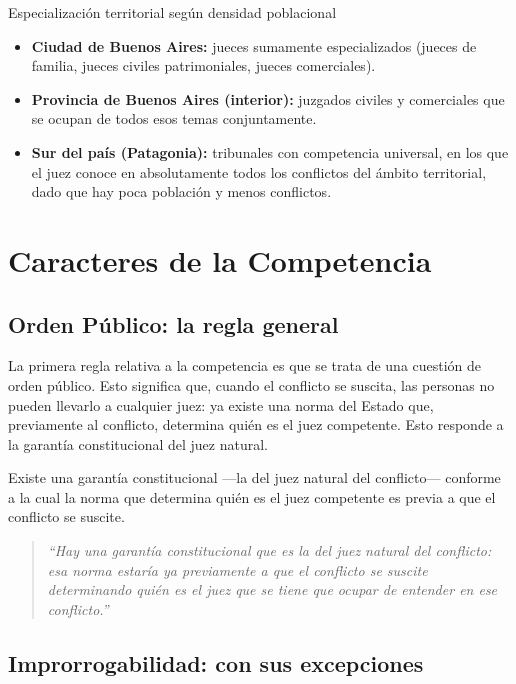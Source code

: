 \documentclass[12pt,oneside]{book}
\begin{document}
\begin{example}{Especialización territorial según densidad poblacional}
\begin{itemize}
\item \textbf{Ciudad de Buenos Aires:} jueces sumamente especializados (jueces de familia, jueces civiles patrimoniales, jueces comerciales).
\item \textbf{Provincia de Buenos Aires (interior):} juzgados civiles y comerciales que se ocupan de todos esos temas conjuntamente.
\item \textbf{Sur del país (Patagonia):} tribunales con competencia universal, en los que el juez conoce en absolutamente todos los conflictos del ámbito territorial, dado que hay poca población y menos conflictos.
\end{itemize}
\end{example}

\section{Caracteres de la Competencia}

\subsection{Orden Público: la regla general}

La primera regla relativa a la competencia es que se trata de una cuestión de orden público. Esto significa que, cuando el conflicto se suscita, las personas no pueden llevarlo a cualquier juez: ya existe una norma del Estado que, previamente al conflicto, determina quién es el juez competente. Esto responde a la garantía constitucional del juez natural.

\begin{important}
Existe una garantía constitucional —la del juez natural del conflicto— conforme a la cual la norma que determina quién es el juez competente es previa a que el conflicto se suscite.
\end{important}

\begin{quote}
\itshape
``Hay una garantía constitucional que es la del juez natural del conflicto: esa norma estaría ya previamente a que el conflicto se suscite determinando quién es el juez que se tiene que ocupar de entender en ese conflicto.''
\end{quote}

\subsection{Improrrogabilidad: con sus excepciones}
\end{document}
